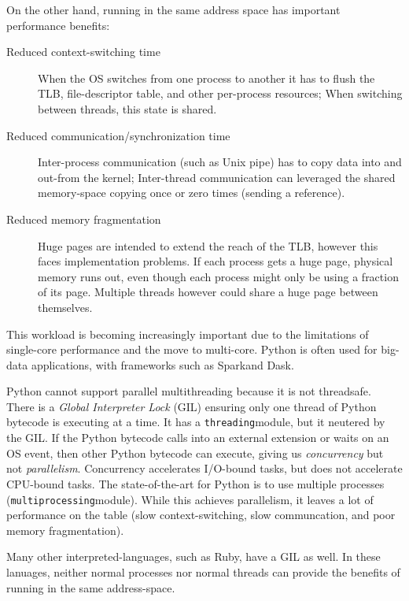 \documentclass[letterpaper,twocolumn,10pt]{article}
\begin{document}
On the other hand, running in the same address space has important performance benefits:

\begin{description}
\item[Reduced context-switching time]
  When the OS switches from one process to another it has to flush the TLB, file-descriptor table, and other per-process resources;
  When switching between threads, this state is shared\citeme.
\item[Reduced communication/synchronization time]
  Inter-process communication (such as Unix pipe) has to copy data into and out-from the kernel;
  Inter-thread communication can leveraged the shared memory-space copying once or zero times (sending a reference)\citeme.
\item[Reduced memory fragmentation]
  Huge pages are intended to extend the reach of the TLB, however this faces implementation problems.
  If each process gets a huge page, physical memory runs out, even though each process might only be using a fraction of its page.
  Multiple threads however could share a huge page between themselves\citeme.
\end{description}

This workload is becoming increasingly important due to the limitations of single-core performance and the move to multi-core\citeme.
Python is often used for big-data applications, with frameworks such as Spark\citeme and Dask\citeme.

Python cannot support parallel multithreading because it is not threadsafe\citeme.
There is a \textit{Global Interpreter Lock} (GIL) ensuring only one thread of Python bytecode is executing at a time\citeme.
It has a \texttt{threading}\citeme module, but it neutered by the GIL.
If the Python bytecode calls into an external extension or waits on an OS event, then other Python bytecode can execute, giving us \textit{concurrency} but not \textit{parallelism}\citeme.
Concurrency accelerates I/O-bound tasks, but does not accelerate CPU-bound tasks.
The state-of-the-art for Python is to use multiple processes (\texttt{multiprocessing}\citeme module)\citeme.
While this achieves parallelism, it leaves a lot of performance on the table (slow context-switching, slow communcation, and poor memory fragmentation).

Many other interpreted-languages, such as Ruby, have a GIL as well.
In these lanuages, neither normal processes nor normal threads can provide the benefits of running in the same address-space.
\end{document}
